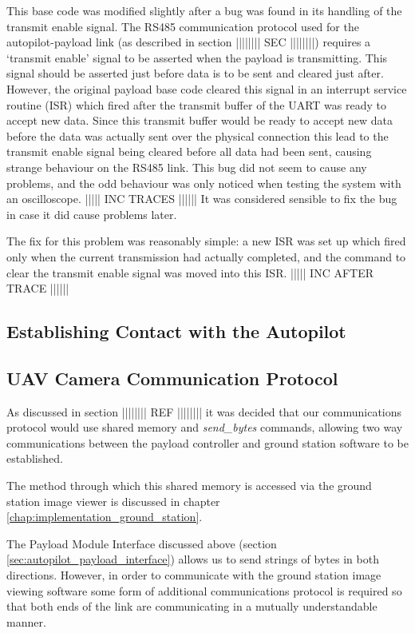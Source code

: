 This base code was modified slightly after a bug was found in its handling of 
the transmit enable signal. The RS485 communication protocol used for the 
autopilot-payload link (as described in section |||||||| SEC ||||||||) 
requires a `transmit enable' signal to be asserted when the payload is 
transmitting. This signal should be asserted just before data is to be sent 
and cleared just after. However, the original payload base code cleared this 
signal in an interrupt service routine (ISR) which fired after the transmit 
buffer of the UART was ready to accept new data. Since this transmit buffer 
would be ready to accept new data before the data was actually sent over the
physical connection this lead to the transmit enable signal being cleared
before all data had been sent, causing strange behaviour on the RS485 link.
This bug did not seem to cause any problems, and the odd behaviour was only
noticed when testing the system with an oscilloscope. ||||| INC TRACES ||||||
It was considered sensible to fix the bug in case it did cause problems later.

The fix for this problem was reasonably simple: a new ISR was set up which 
fired only when the current transmission had actually completed, and the 
command to clear the transmit enable signal was moved into this ISR.
||||| INC AFTER TRACE ||||||

\subsection{Establishing Contact with the Autopilot}



\subsection{UAV Camera Communication Protocol}
As discussed in section |||||||| REF |||||||| it was decided that 
our communications protocol would use shared memory and \emph{send\_bytes} 
commands, allowing two way communications between the payload controller and 
ground station software to be established.

The method through which this shared memory is accessed via the ground station
image viewer is discussed in chapter \ref{chap:implementation_ground_station}.

The Payload Module Interface discussed above (section \ref{sec:autopilot_payload_interface})
allows us to send strings of bytes in both directions. However, in order to 
communicate with the ground station image viewing software some form of 
additional communications protocol is required so that both ends of the link 
are communicating in a mutually understandable manner.

